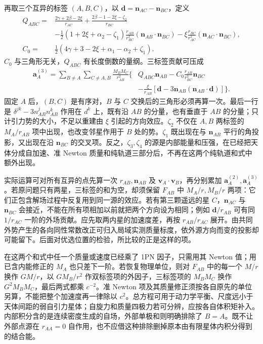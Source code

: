 再取三个互异的标签 $(A,B,C)$，以 $\bm d=\bm n_{AC}-\bm n_{BC}$，定义
\begin{align*}
 Q_{ABC}={}&\frac{2\gamma+2\beta-2\xi}{r_{AC}}
      +\frac{2\beta-1-2\xi-\zeta_2}{r_{BC}}\\
 &-\tfrac12(1+2\xi+\alpha_2-\zeta_1)
     \frac{r_{AB}}{r_{BC}^{2}}(\bm n_{AB}\cdot\bm n_{BC})
      -\xi\frac{r_{BC}}{r_{AC}^{2}}(\bm n_{AC}\cdot\bm n_{BC}),\\
 C_0={}&\tfrac12(4\gamma+3-2\xi+\alpha_1-\alpha_2+\zeta_1).
\end{align*}
$C_0$ 与三角形无关，$Q_{ABC}$ 有长度倒数的量纲。三标签贡献可压成
\begin{align*}
 \bm a_A^{(3)}
   =\sum_{B\ne A}\sum_{C\ne A,B}\frac{M_BM_C}{r_{AB}^{2}}
      \bigg\{&Q_{ABC}\bm n_{AB}
           -C_0\frac{r_{AB}}{r_{BC}^{2}}\bm n_{BC}\\
       &-\frac{\xi}{r_{AB}}
         [\bm d-3\bm n_{AB}(\bm n_{AB}\cdot\bm d)]\bigg\}.
\end{align*}
固定 $A$ 后，$(B,C)$ 是有序对，$B$ 与 $C$ 交换后的三角形必须再算一次。最后一行是 $\delta^{jk}-3n_{AB}^jn_{AB}^k$ 作用在 $d^k$ 上，既有沿 $AB$ 的分量，也有垂直于 $AB$ 的分量；只计引力势的大小，不足以重建由 $\xi$ 引起的方向效应。$\zeta_2$ 不仅在 $A,B$ 两标签的 $M_A/r_{AB}$ 项中出现，也改变邻星作用于 $B$ 处的势。$\zeta_1$ 既出现在与 $\bm n_{AB}$ 平行的角投影，又出现在沿 $\bm n_{BC}$ 的交叉项。反之，$\zeta_3,\zeta_4$ 的源是内部能量和压强，在已经把天体分成自加速、准 Newton 质量和纯轨道三部分后，不再在这两个纯轨道和式中额外出现。

实际运算可对所有互异的点先算一次 $r_{AB},\bm n_{AB}$ 及 $\bm v_A\cdot\bm v_B$，再分别累加 $\bm a_A^{(2)},\bm a_A^{(3)}$。若原问题只有两星，三标签的和为空，却须保留 $F_{AB}$ 中 $M_A/r,M_B/r$ 两项：它们正包含解场过程中反复用到同一源的效应。若有第三颗遥远的星 $C$，$\bm n_{AC}$ 与 $\bm n_{BC}$ 会接近，不能在所有项相加以前就把两个方向设为相同；例如 $\bm d/r_{AB}$ 可有同 $1/r_{AC}$ 一阶的外场贡献。应先取两内星的加速度差，再按 $r_{AB}/r_{AC}$ 展开。由共同外势产生的各向同性常数改正可归入局域实测质量标度，依外源方向而变的投影却可能留下。后面对优选位置的检验，所比较的正是这样的项。

在这两个和式中任一个质量或速度已经乘了 1PN 因子，只需用其 Newton 值；用已含内能修正的 $M_A$ 也只差下一阶。若恢复物理单位，则对 $F_{AB}$ 中的每一个 $M/r$ 换作 $GM/r$，以 $GM_B/r^2$ 作双标签项的外因子，三标签项的 $M_BM_C$ 换作 $G^2M_BM_C$，最后两式都乘 $c^{-2}$。准 Newton 项及其质量修正须按各自原先的单位另算，不能把整个加速度再一律除以 $c^2$。总方程可用于动力学平衡、尺度远小于天体间距的弱自引力星体；自旋力和质量四极力若可分辨，应按各自体积矩补入。内部积分含的是连续密度生成的自场，外部单极和则明确排除了 $B=A$。既不让外部点源在 $r_{AA}=0$ 自作用，也不应借这种排除删掉原本由有限星体内积分得到的结合能。

